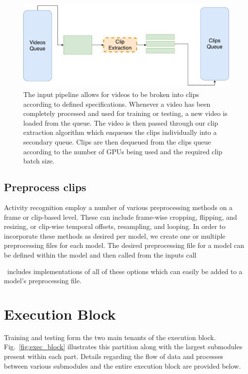 \documentclass{llncs}
\begin{document}
\begin{figure}[b!]
\centering
\includegraphics[width=0.8\columnwidth]{images/extract_clips.pdf}
\caption{The input pipeline allows for videos to be broken into clips according to defined specifications.
Whenever a video has been completely processed and used for training or testing, a new video is loaded from the queue.
The video is then passed through our clip extraction algorithm which enqueues the clips individually into a secondary queue.
Clips are then dequeued from the clips queue according to the number of GPUs being used and the required clip batch size.}
\label{fig:extract_clips}
\end{figure}


\subsection{Preprocess clips}
\label{sec:preprocessclips}
Activity recognition employ a number of various preprocessing methods on a frame or clip-based level.
These can include frame-wise cropping, flipping, and resizing, or clip-wise temporal offsets, resampling, and looping.
In order to incorporate these methods as desired per model, we create one or multiple preprocessing files for each model.
The desired preprocessing file for a model can be defined within the model and then called from the inputs call 

\acro~includes implementations of all of these options which can easily be added to a model's preprocessing file.



\section{Execution Block}
\label{sec:execblock}
Training and testing form the two main tenants of the execution block. 
Fig.~\ref{fig:exec_block} illustrates this partition along with the largest submodules present within each part.
Details regarding the flow of data and processes between various submodules and the entire execution block are provided below.
\end{document}
